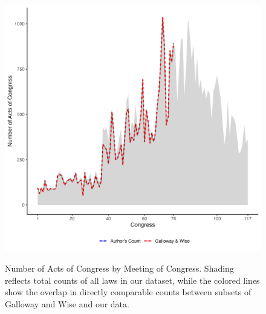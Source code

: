 \documentclass[fleqn,10pt]{wlscirep}
\begin{document}
\begin{figure}[h]
  \centering
  \caption{Number of Acts of Congress by Meeting of Congress. Shading reflects total counts of all laws in our dataset, while the colored lines show the overlap in directly comparable counts between subsets of Galloway and Wise and our data.}
  \includegraphics[width=\linewidth]{draft/figures/counts_of_laws_revised.png}
    \label{fig:totals}
\end{figure}
\end{document}
